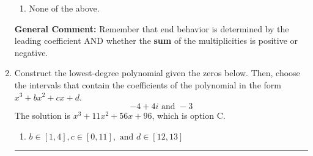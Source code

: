 \documentclass{extbook}[14pt]
\newcommand{\litem}[1]{\item #1

\rule{\textwidth}{0.4pt}}
\begin{document}
\begin{enumerate}
{\begin{center}
\end{center}\begin{enumerate}[label=\Alph*.]
\item None of the above.\end{enumerate}
\textbf{General Comment:} Remember that end behavior is determined by the leading coefficient AND whether the \textbf{sum} of the multiplicities is positive or negative.
}
\litem{
Construct the lowest-degree polynomial given the zeros below. Then, choose the intervals that contain the coefficients of the polynomial in the form $x^3+bx^2+cx+d$.
\[ -4 + 4 i \text{ and } -3 \]The solution is \( x^{3} +11 x^{2} +56 x + 96 \), which is option C.\begin{enumerate}[label=\Alph*.]
\item \( b \in [1, 4], c \in [0, 11], \text{ and } d \in [12, 13] \)


\end{enumerate}}
\end{enumerate}
\end{document}
